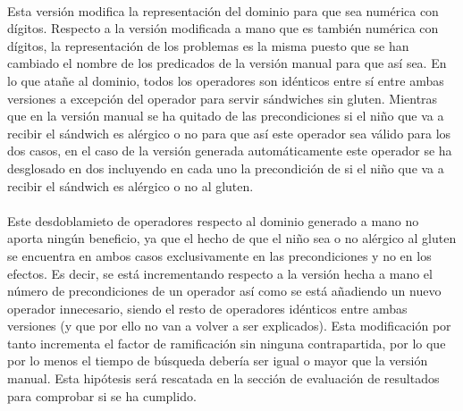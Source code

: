 \documentclass{article}
\begin{document}
\paragraph{}
Esta versión modifica la representación del dominio para que sea numérica con dígitos. Respecto a la versión modificada a mano que es también numérica con dígitos, la representación de los problemas es la misma puesto que se han cambiado el nombre de los predicados de la versión manual para que así sea. En lo que atañe al dominio, todos los operadores son idénticos entre sí entre ambas versiones a excepción del operador para servir sándwiches sin gluten. Mientras que en la versión manual se ha quitado de las precondiciones si el niño que va a recibir el sándwich es alérgico o no para que así este operador sea válido para los dos casos, en el caso de la versión generada automáticamente este operador se ha desglosado en dos incluyendo en cada uno la precondición de si el niño que va a recibir el sándwich es alérgico o no al gluten.

\paragraph{}
Este desdoblamieto de operadores respecto al dominio generado a mano no aporta ningún beneficio, ya que el hecho de que el niño sea o no alérgico al gluten se encuentra en ambos casos exclusivamente en las precondiciones y no en los efectos. Es decir, se está incrementando respecto a la versión hecha a mano el número de precondiciones de un operador así como se está añadiendo un nuevo operador innecesario, siendo el resto de operadores idénticos entre ambas versiones (y que por ello no van a volver a ser explicados). Esta modificación por tanto incrementa el factor de ramificación sin ninguna contrapartida, por lo que por lo menos el tiempo de búsqueda debería ser igual o mayor que la versión manual. Esta hipótesis será rescatada en la sección de evaluación de resultados para comprobar si se ha cumplido.
\end{document}
